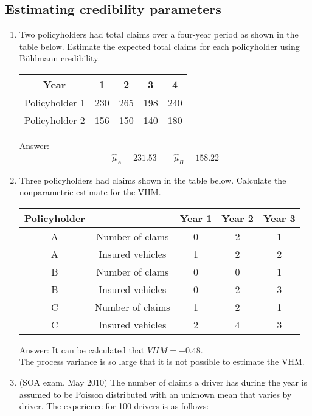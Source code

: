\documentclass[11pt,a4paper,onecolumn]{article}
\begin{document}
\subsection{Estimating credibility parameters}
	\begin{enumerate}
		\item  Two policyholders had total claims over a four-year period as shown in the table below. Estimate the expected total claims for each policyholder using B\"{u}hlmann credibility.\par
		\begin{table}[H]
			\centering
			\begin{tabular}{c|cccc}
				\hline
				Year & 1 & 2 & 3& 4\\
			 \hline
				Policyholder 1 & 230 & 265 & 198 & 240\\
				Policyholder 2 & 156 & 150 & 140 & 180\\
				\hline
			\end{tabular}
		\end{table}
		Answer:\\
		\begin{align*}
		\hat{\mu}_A = 231.53\qquad \hat{\mu}_B = 158.22
		\end{align*}
		\item Three policyholders had claims shown in the table below. Calculate the nonparametric estimate for the VHM.\par
			\begin{table}[H]
			\centering
			\begin{tabular}{c|cccc}
				\hline
				Policyholder & & Year 1 & Year 2 & Year 3 \\
				\hline
			A & Number of clams & 0 & 2 & 1\\
			A & Insured vehicles & 1 & 2 & 2\\
			\hline
				B & Number of clams & 0 & 0 & 1\\
			B & Insured vehicles & 0 & 2  & 3 \\
             \hline
            C & Number of claims & 1 & 2 & 1\\
           C & Insured vehicles & 2 & 4 & 3\\			
				\hline
			\end{tabular}
		\end{table}
	Answer: It can be calculated that $VHM = -0.48$.\\
	The process variance is so large that it is not possible to estimate the VHM.
	\item (SOA exam, May 2010) The number of claims a driver has during the year is assumed to be Poisson distributed with an unknown mean that varies by driver. The experience for 100 drivers is as follows:

\end{enumerate}
\end{document}

